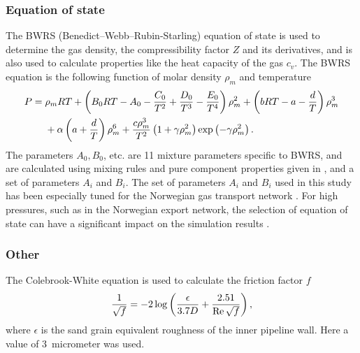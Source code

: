 \subsubsection{Equation of state}
The BWRS (Benedict–Webb–Rubin-Starling) equation of state \cite{Starling1973Fluid} is used to determine the gas density, the compressibility factor $Z$ and its derivatives, and is also used to calculate properties like the heat capacity of the gas $c_v$. The BWRS equation is the following function of molar density $\rho_m$ and temperature
\begin{align}
\begin{split}
    P ={} &\rho_m RT 
    + \del{B_0 RT - A_0 - \frac{C_0}{T^2} + \frac{D_0}{T^3} - \frac{E_0}{T^4}}\rho_m^2 
    + \del{bRT - a - \frac{d}{T}}\rho_m^3 
    \\&
    + \alpha \del{a + \frac{d}{T}}\rho_m^6 
    + \frac{c\rho_m^3}{T^2}\del{1 + \gamma \rho_m^2} \exp\del{-\gamma \rho_m^2}
.
\end{split}
\end{align}
The parameters $A_0, B_0$, etc. are 11 mixture parameters specific to BWRS, and are calculated using mixing rules and pure component properties given in \cite{Starling1973Fluid}, and a set of parameters $A_i$ and $B_i$.%
The set of parameters $A_i$ and $B_i$ used in this study has been especially tuned for the Norwegian gas transport network%
%
. For high pressures, such as in the Norwegian export network, the selection of equation of state can have a significant impact on the simulation results \cite{Helgaker2014Transient,Chaczykowski2009Sensitivity}.

\subsubsection{Other}
The Colebrook-White equation \cite{Colebrook1939Turbulent} is used to calculate the friction factor $f$
\begin{align}
    \frac{1}{\sqrt{f}} = -2\log \del{\frac{\epsilon}{3.7 D} + \frac{2.51}{\Reyn \sqrt{f}}}
    \label{eq:colebrookWhite}
,
\end{align}
where $\epsilon$ is the sand grain equivalent roughness of the inner pipeline wall. Here a value of 3~micrometer was used.